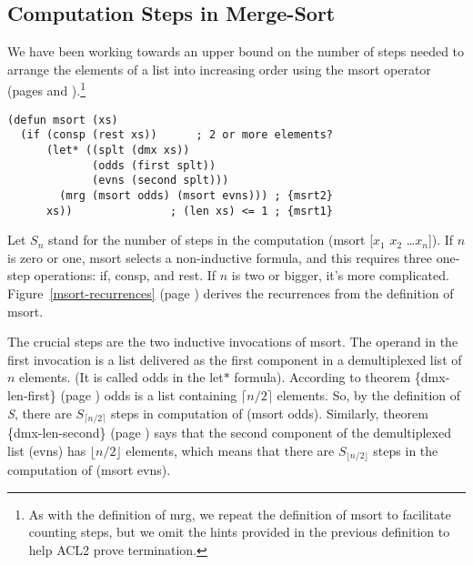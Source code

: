 \subsection{Computation Steps in Merge-Sort}
\label{subsec:msort-steps}

We have been working towards an upper bound on the number of steps
needed to arrange the elements of a list into increasing order
using the \textsf{msort} operator
(pages \pageref{defun:msort} and \pageref{defun:msort-copy}).\footnote{As
with the definition of \textsf{mrg}, we repeat the definition of \textsf{msort}
to facilitate counting steps, but we omit the hints
provided in the previous definition to help ACL2 prove termination.}

\begin{Verbatim}
(defun msort (xs)
  (if (consp (rest xs))      ; 2 or more elements?
      (let* ((splt (dmx xs))
             (odds (first splt))
             (evns (second splt)))
        (mrg (msort odds) (msort evns))) ; {msrt2}
      xs))               ; (len xs) <= 1 ; {msrt1}
\end{Verbatim}
\label{defun:msort-copy}

Let $S_n$ stand for the number of steps in the computation
\textsf{(msort [$x_1$ $x_2$ \dots $x_n$])}.
If $n$ is zero or one, \textsf{msort} selects a non-inductive
formula, and this requires three one-step operations:
\textsf{if}, \textsf{consp}, and \textsf{rest}.
If $n$ is two or bigger, it's more complicated.
Figure~\ref{msort-recurrences} (page \pageref{msort-recurrences})
derives the recurrences from the definition of \textsf{msort}.

The crucial steps are the two inductive invocations of \textsf{msort}.
The operand in the first invocation is a list delivered as the first component in
a demultiplexed list of $n$ elements.
(It is called \textsf{odds} in the \textsf{let$*$} formula).
According to theorem \{dmx-len-first\} (page \pageref{thm:dmx-length-first-second})
\textsf{odds} is a list containing $\lceil  n/2\rceil$ elements.
So, by the definition of \emph{S},
there are $S_{\lceil n/2\rceil}$ steps in computation of \textsf{(msort odds)}.
Similarly, theorem  \{dmx-len-second\} (page \pageref{thm:dmx-length-first-second})
says that the second component of the demultiplexed list (\textsf{evns})
has $\lfloor n/2\rfloor$ elements, which means that there are
$S_{\lfloor n/2\rfloor}$ steps in the computation of \textsf{(msort evns)}.

